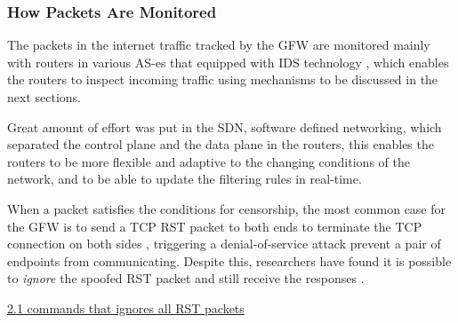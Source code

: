 \hypertarget{how-packets-are-monitored}{%
\subsubsection{How Packets Are
Monitored}\label{how-packets-are-monitored}}

The packets in the internet traffic tracked by the GFW are monitored
mainly with routers in various AS-es that equipped with IDS technology
\cite{03_whereFilter}, which enables the routers to inspect incoming
traffic using mechanisms to be discussed in the next sections.

Great amount of effort was put in the SDN, software defined networking,
which separated the control plane and the data plane in the routers,
this enables the routers to be more flexible and adaptive to the
changing conditions of the network, and to be able to update the
filtering rules in real-time. \cite{15_SDN}

When a packet satisfies the conditions for censorship, the most common
case for the GFW is to send a TCP RST packet to both ends to terminate
the TCP connection on both sides \cite{03_whereFilter}, triggering a
denial-of-service attack prevent a pair of endpoints from communicating.
Despite this, researchers have found it is possible to \emph{ignore} the
spoofed RST packet and still receive the responses \cite{06_ignoring}.

\begin{Shaded}
\begin{Highlighting}[]
 
\end{Highlighting}
\end{Shaded}

\href{}{2.1 commands that ignores all RST packets}

